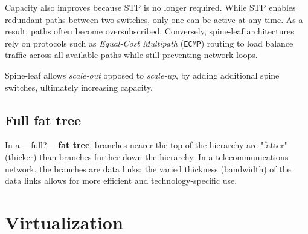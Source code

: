Capacity also improves because STP is no longer required. While STP enables redundant paths between two switches, only one can be active at any time. As a result, paths often become oversubscribed. 
Conversely, spine-leaf architectures rely on protocols such as \textit{Equal-Cost Multipath} (\texttt{ECMP}) routing to load balance traffic across all available paths while still preventing network loops.

Spine-leaf allows \textit{scale-out} opposed to \textit{scale-up}, by adding additional spine switches, ultimately increasing capacity.

\subsection{Full fat tree}
In a ---full?--- \textbf{fat tree}, branches nearer the top of the hierarchy are "fatter" (thicker) than branches further down the hierarchy. In a telecommunications network, the branches are data links; the varied thickness (bandwidth) of the data links allows for more efficient and technology-specific use.
\section{Virtualization}